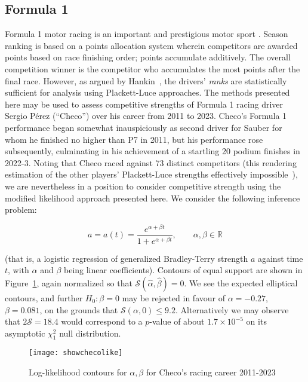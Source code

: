 \documentclass[ejs,noshowframe]{imsart}
\theoremstyle{plain}
\theoremstyle{definition}
\theoremstyle{remark}
\begin{document}
\subsection{Formula 1}

Formula 1 motor racing is an important and prestigious motor sport
\citep{codling2017,jenkins2010}.  Season ranking is based on a points
allocation system wherein competitors are awarded points based on race
finishing order; points accumulate additively.  The overall
competition winner is the competitor who accumulates the most points
after the final race.  However, as argued by
Hankin~\cite{hankin2023_formula1points}, the drivers' {\em ranks} are
statistically sufficient for analysis using Plackett-Luce approaches.
The methods presented here may be used to assess competitive strengths
of Formula 1 racing driver Sergio P\'{e}rez (``Checo'') over his
career from 2011 to 2023.  Checo's Formula 1 performance began
somewhat inauspiciously as second driver for Sauber for whom he
finished no higher than P7 in 2011, but his performance rose
subsequently, culminating in his achievement of a startling 20 podium
finishes in 2022-3.  Noting that Checo raced against 73 distinct
competitors (this rendering estimation of the other players'
Plackett-Luce strengths effectively impossible~\cite{hankin2020}), we
are nevertheless in a position to consider competitive strength using
the modified likelihood approach presented here.  We consider the
following inference problem:

\begin{equation}
  a = a(t) = \frac{e^{\alpha + \beta t}}{1+e^{\alpha + \beta t}},\qquad\alpha,\beta\in\mathbb{R}
\end{equation}

(that is, a logistic regression of generalized Bradley-Terry strength
$a$ against time $t$, with $\alpha$ and $\beta$ being linear
coefficients).  Contours of equal support are shown in
Figure~\ref{showchecolike}, again normalized so that
$\mathcal{S}(\hat{\alpha},\hat{\beta})=0$.  We see the expected
elliptical contours, and further $H_0\colon\beta=0$ may be rejected in
favour of $\alpha=-0.27$, $\beta=0.081$, on the grounds that
$\mathcal{S}(\alpha,0)\leqslant 9.2$.  Alternatively we may observe
that $2\mathcal{S}=18.4$ would correspond to a $p$-value of about
$1.7\times 10^{-5}$ on its asymptotic $\chi^2_1$ null distribution.

\begin{figure}[t]
\texttt{[image: showchecolike]}  %
\caption{Log-likelihood contours for $\alpha,\beta$ for Checo's racing
  career 2011-2023\label{showchecolike}}
\end{figure}
\end{document}
